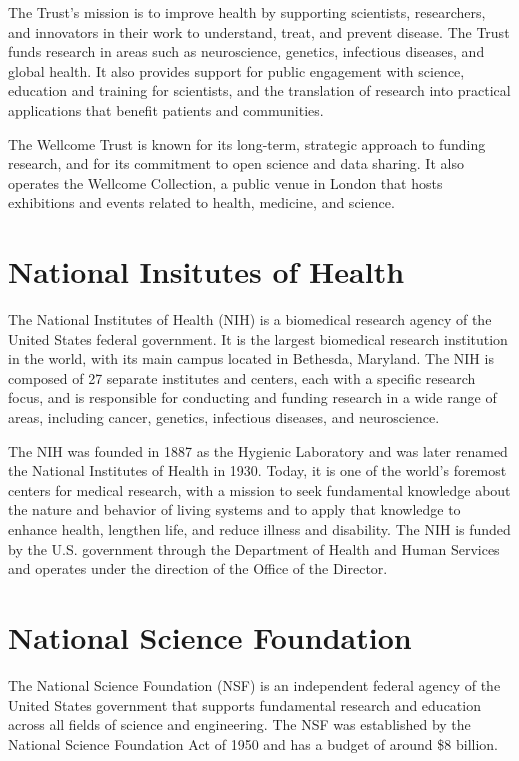 \documentclass[
]{book}
\begin{document}
The Trust's mission is to improve health by supporting scientists, researchers, and innovators in their work to understand, treat, and prevent disease. The Trust funds research in areas such as neuroscience, genetics, infectious diseases, and global health. It also provides support for public engagement with science, education and training for scientists, and the translation of research into practical applications that benefit patients and communities.

The Wellcome Trust is known for its long-term, strategic approach to funding research, and for its commitment to open science and data sharing. It also operates the Wellcome Collection, a public venue in London that hosts exhibitions and events related to health, medicine, and science.

\hypertarget{nih}{%
\section{National Insitutes of Health}\label{nih}}

The National Institutes of Health (NIH) is a biomedical research agency of the United States federal government. It is the largest biomedical research institution in the world, with its main campus located in Bethesda, Maryland. The NIH is composed of 27 separate institutes and centers, each with a specific research focus, and is responsible for conducting and funding research in a wide range of areas, including cancer, genetics, infectious diseases, and neuroscience.

The NIH was founded in 1887 as the Hygienic Laboratory and was later renamed the National Institutes of Health in 1930. Today, it is one of the world's foremost centers for medical research, with a mission to seek fundamental knowledge about the nature and behavior of living systems and to apply that knowledge to enhance health, lengthen life, and reduce illness and disability. The NIH is funded by the U.S. government through the Department of Health and Human Services and operates under the direction of the Office of the Director.

\hypertarget{nsf}{%
\section{National Science Foundation}\label{nsf}}

The National Science Foundation (NSF) is an independent federal agency of the United States government that supports fundamental research and education across all fields of science and engineering. The NSF was established by the National Science Foundation Act of 1950 and has a budget of around \$8 billion.
\end{document}
